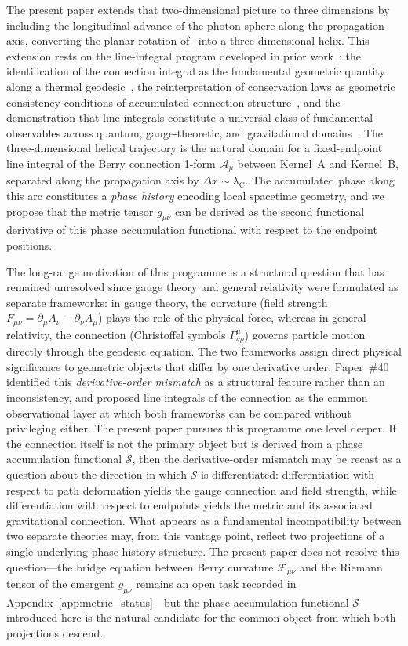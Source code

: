 \documentclass[%
 reprint, amsmath,amssymb, aps, prb, ]{revtex4-2}
\numberwithin{equation}{section}
\newcommand{\lambdaC}{\lambda_{\mathrm{C}}}
\begin{document}
The present paper extends that two-dimensional picture to three dimensions by including the longitudinal advance of the photon sphere along the propagation axis, converting the planar rotation of~\cite{hanamura50} into a three-dimensional helix. This extension rests on the line-integral program developed in prior work~\cite{hanamura29, hanamura30, hanamura31}: the identification of the connection integral as the fundamental geometric quantity along a thermal geodesic~\cite{hanamura29}, the reinterpretation of conservation laws as geometric consistency conditions of accumulated connection structure~\cite{hanamura30}, and the demonstration that line integrals constitute a universal class of fundamental observables across quantum, gauge-theoretic, and gravitational domains~\cite{hanamura31}. The three-dimensional helical trajectory is the natural domain for a fixed-endpoint line integral of the Berry connection 1-form $\mathcal{A}_\mu$ between Kernel~A and Kernel~B, separated along the propagation axis by $\Delta x\sim\lambdaC$. The accumulated phase along this arc constitutes a \emph{phase history} encoding local spacetime geometry, and we propose that the metric tensor $g_{\mu\nu}$ can be derived as the second functional derivative of this phase accumulation functional with respect to the endpoint positions.

The long-range motivation of this programme is a structural question that has remained unresolved since gauge theory and general relativity were formulated as separate frameworks: in gauge theory, the curvature (field strength $F_{\mu\nu} = \partial_\mu A_\nu - \partial_\nu A_\mu$) plays the role of the physical force, whereas in general relativity, the connection (Christoffel symbols $\Gamma^\mu_{\nu\rho}$) governs particle motion directly through the geodesic equation. The two frameworks assign direct physical significance to geometric objects that differ by one derivative order. Paper~\#40~\cite{hanamura40} identified this \emph{derivative-order mismatch} as a structural feature rather than an inconsistency, and proposed line integrals of the connection as the common observational layer at which both frameworks can be compared without privileging either. The present paper pursues this programme one level deeper. If the connection itself is not the primary object but is derived from a phase accumulation functional $\mathcal{S}$, then the derivative-order mismatch may be recast as a question about the direction in which $\mathcal{S}$ is differentiated: differentiation with respect to path deformation yields the gauge connection and field strength, while differentiation with respect to endpoints yields the metric and its associated gravitational connection. What appears as a fundamental incompatibility between two separate theories may, from this vantage point, reflect two projections of a single underlying phase-history structure. The present paper does not resolve this question---the bridge equation between Berry curvature $\mathcal{F}_{\mu\nu}$ and the Riemann tensor of the emergent $g_{\mu\nu}$ remains an open task recorded in Appendix~\ref{app:metric_status}---but the phase accumulation functional $\mathcal{S}$ introduced here is the natural candidate for the common object from which both projections descend.
\end{document}
